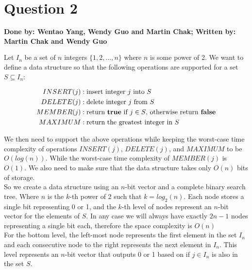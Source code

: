 \documentclass[20pt]{article}
\begin{document}
\section*{Question 2}
\textbf{Done by: Wentao Yang, Wendy Guo and Martin Chak; Written by: Martin Chak and Wendy Guo}
\begin{text}
Let $I_n$ be a set of $n$ integers $\{1, 2, ..., n\}$ where $n$ is some power of 2. We want to define a data structure so that the following operations are supported for a set $S \subseteq I_n$:
\end{text}
\begin{align}
    INSERT(j) &: \text{insert integer $j$ into $S$}\nonumber\\
    DELETE(j) &: \text{delete integer $j$ from $S$}\nonumber\\
    MEMBER(j) &: \text{return \textbf{true} if $j \in S$, otherwise return \textbf{false}}\nonumber\\
    MAXIMUM &: \text{return the greatest integer in $S$}\nonumber
\end{align}

\noindent
\begin{text}
    We then need to support the above operations while keeping the worst-case time complexity of operations $INSERT(j)$, $DELETE(j)$, and $MAXIMUM$ to be $O(log(n))$. While the worst-case time complexity of $MEMBER(j)$ is $O(1)$. We also need to make sure that the data structure takes only $O(n)$ bits of storage.\\
    
    \noindent
    So we create a data structure using an $n$-bit vector and a complete binary search tree. Where $n$ is the $k$-th power of 2 such that $k = log_{2}(n)$. Each node stores a single bit representing 0 or 1, and the $k$-th level of nodes represent an $n$-bit vector for the elements of $S$. In any case we will always have exactly $2n-1$ nodes representing a single bit each, therefore the space complexity is $O(n)$\\
    
    \noindent
    For the bottom level, the left-most node represents the first element in the set $I_n$ and each consecutive node to the right represents the next element in $I_n$. This level represents an $n$-bit vector that outputs 0 or 1 based on if $j \in I_n$ is also in the set $S$.\\
\end{text}
\end{document}
